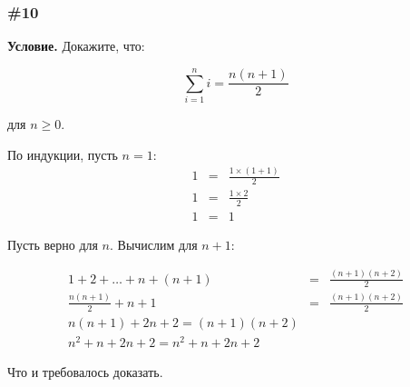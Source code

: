 \documentclass{article}
\begin{document}
\subsubsection{\#10}

\textbf{Условие.}
Докажите, что:

\begin{equation}
    \sum_{i=1}^ni=\frac{n(n+1)}{2}
\end{equation}

для \(n \geqslant 0\).

По индукции, пусть \(n=1\):
\begin{eqnarray}
    1 &=& \frac{1\times(1 + 1)}{2}\\
    1 &=& \frac{1 \times 2}{2}\\
    1 &=& 1
\end{eqnarray}

Пусть верно для \(n\).
Вычислим для \(n+1\):

\begin{eqnarray}
    1 + 2 + \ldots + n + (n + 1) &=& \frac{(n+1)(n+2)}{2}\\
    \frac{n(n+1)}{2} + n + 1 &=& \frac{(n+1)(n+2)}{2}\\
    n(n + 1) + 2n + 2 = (n + 1)(n + 2)\\
    n^2 + n + 2n + 2 = n^2 + n + 2n + 2
\end{eqnarray}

Что и требовалось доказать.
\end{document}
